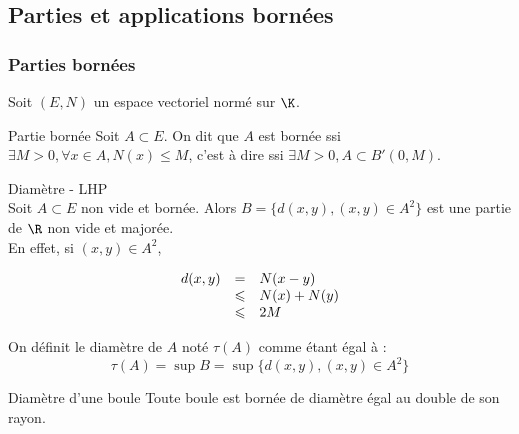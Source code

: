 \subsection{Parties et applications bornées}


\subsubsection{Parties bornées}

Soit $(E, N)$ un espace vectoriel normé sur $\K$. 

\begin{definition}{Partie bornée}{}
    Soit $A \subset E$. On dit que $A$ est bornée ssi $\exists M > 0, \forall x \in A, N(x) \leqslant M$, 
    c'est à dire ssi $\exists M > 0, A \subset B'(0, M)$.
\end{definition}

\begin{theoreme}{Diamètre - LHP}{}
    \\Soit $A \subset E$ non vide et bornée. 
    Alors $B = \{d(x, y), (x, y) \in A^2\}$ est une partie de $\R$ non vide et majorée.\\

    En effet, si $(x, y) \in A^2$, 

    \[
    \begin{array}{rcl}
        d(x, y) & = & N(x - y) \\
        \space & \leqslant & N(x) + N(y) \\
        \space & \leqslant & 2 M \\
    \end{array}
    \]

    On définit le diamètre de $A$ noté $\tau(A)$ comme étant égal à : 
    $$\tau(A) = \sup B = \sup \{d(x, y), (x, y) \in A^2\}$$
\end{theoreme}

\begin{proposition}{Diamètre d'une boule}{}
    Toute boule est bornée de diamètre égal au double de son rayon.
\end{proposition}


